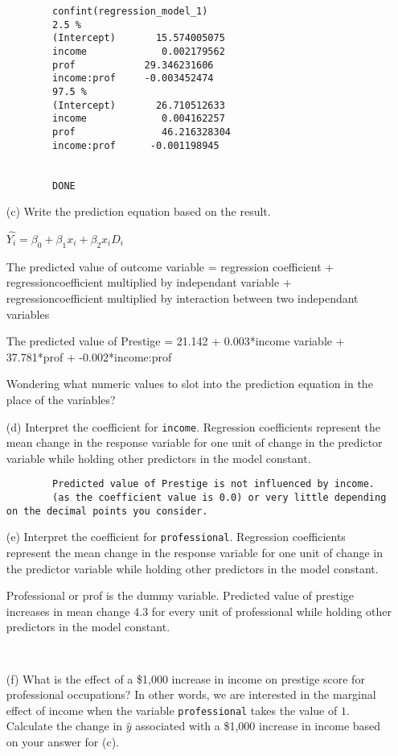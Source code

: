 \documentclass[12pt,letterpaper]{article}
\begin{document}
\begin{enumerate}
\begin{verbatim}
		confint(regression_model_1)
		2.5 %
		(Intercept)       15.574005075
		income             0.002179562
		prof        	29.346231606
		income:prof 	-0.003452474
		97.5 %
		(Intercept)       26.710512633
		income             0.004162257
		prof		       46.216328304
		income:prof		 -0.001198945
		
		
		DONE
		\end{verbatim}
	
		\item [(c)]
		Write the prediction equation based on the result.
	
		$\hat{Y_i}=\beta_0+\beta_1x_i+\beta_2x_iD_i$
	
	
		
		The predicted value of outcome variable = regression coefficient + regressioncoefficient multiplied by independant variable + regressioncoefficient multiplied by interaction between two independant variables
		
		
		The predicted value of Prestige = 21.142 +  0.003*income variable   +   37.781*prof
		+ -0.002*income:prof 
		
		Wondering what numeric values to slot 
		into the prediction equation in the place of the variables?
		\newpage
		\item [(d)]
		Interpret the coefficient for \texttt{income}.
		Regression coefficients represent the mean change in the response variable for one unit of change in the predictor variable while holding other predictors in the model constant.
		\begin{verbatim}
		Predicted value of Prestige is not influenced by income. 
		(as the coefficient value is 0.0) or very little depending on the decimal points you consider.
		\end{verbatim}
		
		\item [(e)]
		Interpret the coefficient for \texttt{professional}.
		Regression coefficients represent the mean change in the response variable for one unit of change in the predictor variable while holding other predictors in the model constant.
		
		
		Professional or prof is the dummy variable.
		Predicted value of prestige increases in mean change 4.3 for every unit of professional while holding other predictors in the model constant.
	 
			\begin{verbatim}
		
		\end{verbatim}
		\newpage
		\item [(f)]
		What is the effect of a \$1,000 increase in income on prestige score for professional occupations? In other words, we are interested in the marginal effect of income when the variable \texttt{professional} takes the value of $1$. Calculate the change in $\hat{y}$ associated with a \$1,000 increase in income based on your answer for (c).
	

\end{enumerate}
\end{document}
